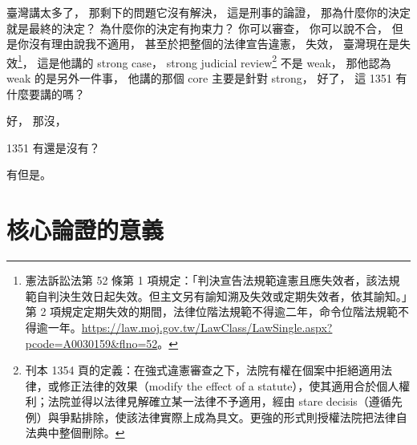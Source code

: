 \hypertarget{w06:cue:240}{}臺灣講太多了，
\hypertarget{w06:cue:241}{}那剩下的問題它沒有解決，
\hypertarget{w06:cue:242}{}這是刑事的論證，
\hypertarget{w06:cue:243}{}那為什麼你的決定就是最終的決定？
\hypertarget{w06:cue:244}{}為什麼你的決定有拘束力？
\hypertarget{w06:cue:245}{}你可以審查，
\hypertarget{w06:cue:246}{}你可以說不合，
\hypertarget{w06:cue:247}{}但是你沒有理由說我不適用，
\hypertarget{w06:cue:248}{}甚至於把整個的法律宣告違憲，
\hypertarget{w06:cue:249}{}失效，
\hypertarget{w06:cue:250}{}臺灣現在是失效\footnote{憲法訴訟法第 52 條第 1 項規定：「判決宣告法規範違憲且應失效者，該法規範自判決生效日起失效。但主文另有諭知溯及失效或定期失效者，依其諭知。」第 2 項規定定期失效的期間，法律位階法規範不得逾二年，命令位階法規範不得逾一年。\url{https://law.moj.gov.tw/LawClass/LawSingle.aspx?pcode=A0030159&flno=52}。}，
\hypertarget{w06:cue:251}{}這是他講的 strong case，
\hypertarget{w06:cue:252}{}strong judicial review\footnote{刊本 1354 頁的定義：在強式違憲審查之下，法院有權在個案中拒絕適用法律，或修正法律的效果（modify the effect of a statute），使其適用合於個人權利；法院並得以法律見解確立某一法律不予適用，經由 stare decisis（遵循先例）與爭點排除，使該法律實際上成為具文。更強的形式則授權法院把法律自法典中整個刪除。}
\hypertarget{w06:cue:253}{}不是 weak，
\hypertarget{w06:cue:254}{}那他認為 weak 的是另外一件事，
\hypertarget{w06:cue:255}{}他講的那個 core 主要是針對 strong，
\hypertarget{w06:cue:256}{}好了，
\hypertarget{w06:cue:257}{}這 1351 有什麼要講的嗎？

\hypertarget{w06:cue:258}{}好，
\hypertarget{w06:cue:259}{}那沒，

\hypertarget{w06:cue:260}{}1351 有還是沒有？

\hypertarget{w06:cue:261}{}有但是。

\section{核心論證的意義}


